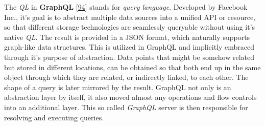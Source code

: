 \documentclass[12pt,english,a4paper,titlepage,cleardoublepage=empty,dottedtoc]{report}
\begin{document}
The \emph{QL} in \textbf{\protect\hypertarget{link-graphql}{}{GraphQL}}
{[}\protect\hyperlink{ref-web_spec_graphql}{94}{]} stands for
\emph{query language}. Developed by Facebook Inc., it's goal is to
abstract multiple data sources into a unified API or resource, so that
different storage technologies are seamlessly queryable without using
it's native \emph{QL}. The result is provided in a JSON format, which
naturally supports graph-like data structures. This is utilized in
GraphQL and implicitly embraced through it's purpose of abstraction.
Data points that might be somehow related but stored in different
locations, can be obtained so that both end up in the same object
through which they are related, or indirectly linked, to each other. The
shape of a query is later mirrored by the result. GraphQL not only is an
abstraction layer by itself, it also moved almost any operations and
flow controls into an additional layer. This so called \emph{GraphQL}
server is then responsible for resolving and executing queries.
\end{document}
